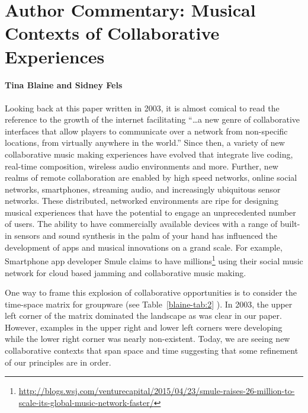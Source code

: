 \section*{Author Commentary: Musical Contexts of Collaborative Experiences}

\paragraph{Tina Blaine and Sidney Fels}

Looking back at this paper written in 2003, it is almost comical to read the reference to the growth of the internet facilitating ``\ldots a new genre of collaborative interfaces that allow players to communicate over a network from non-specific locations, from virtually anywhere in the world.''  Since then, a variety of new collaborative music making experiences have evolved that integrate live coding, real-time composition, wireless audio environments and more. Further, new realms of remote collaboration are enabled by high speed networks, online social networks, smartphones, streaming audio, and increasingly ubiquitous sensor networks. These distributed, networked environments are ripe for designing musical experiences that have the potential to engage an unprecedented number of users. The ability to have commercially available devices with a range of built-in sensors and sound synthesis in the palm of your hand has influenced the development of apps and musical innovations on a grand scale.  For example, Smartphone app developer Smule claims to have millions\footnote{\url{http://blogs.wsj.com/venturecapital/2015/04/23/smule-raises-26-million-to-scale-its-global-music-network-faster/}} using their social music network for cloud based jamming and collaborative music making.
 
One way to frame this explosion of collaborative opportunities is to consider the time-space matrix for groupware (see Table~\ref{blaine-tab:2} \cite{Baecker:1995}). In 2003, the upper left corner of the matrix dominated the landscape as was clear in our paper. However, examples in the upper right and lower left corners were developing while the lower right corner was nearly non-existent. Today, we are seeing new collaborative contexts that span space and time suggesting that some refinement of our principles are in order.

